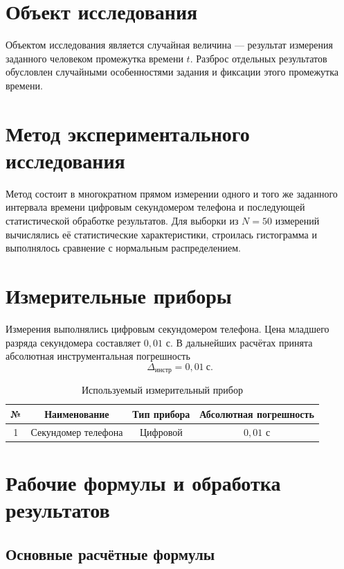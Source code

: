 \documentclass[a4paper,14pt]{extarticle}
\begin{document}
	\section{Объект исследования}
	Объектом исследования является случайная величина --- результат измерения заданного человеком промежутка времени $t$. Разброс отдельных результатов обусловлен случайными особенностями задания и фиксации этого промежутка времени.

	\section{Метод экспериментального исследования}
	Метод состоит в многократном прямом измерении одного и того же заданного интервала времени цифровым секундомером телефона и последующей статистической обработке результатов. Для выборки из $N=50$ измерений вычислялись её статистические характеристики, строилась гистограмма и выполнялось сравнение с нормальным распределением.

	\section{Измерительные приборы}

	Измерения выполнялись цифровым секундомером телефона. Цена младшего разряда секундомера составляет $0{,}01$ с. В дальнейших расчётах принята абсолютная инструментальная погрешность
	\[
	\Delta_{\text{инстр}}=0{,}01\ \text{с}.
	\]

	\begin{table}[h!]
		\centering
		\caption{Используемый измерительный прибор}
		\label{tab:instrument}
		\renewcommand{\arraystretch}{1.25}
		\begin{tabular}{|c|c|c|c|}
			\hline
			№ & Наименование & Тип прибора & Абсолютная погрешность \\ \hline
			1 & Секундомер телефона & Цифровой & $0{,}01$ с \\ \hline
		\end{tabular}
	\end{table}

	\section{Рабочие формулы и обработка результатов}
	
	\subsection{Основные расчётные формулы}
	
\end{document}
